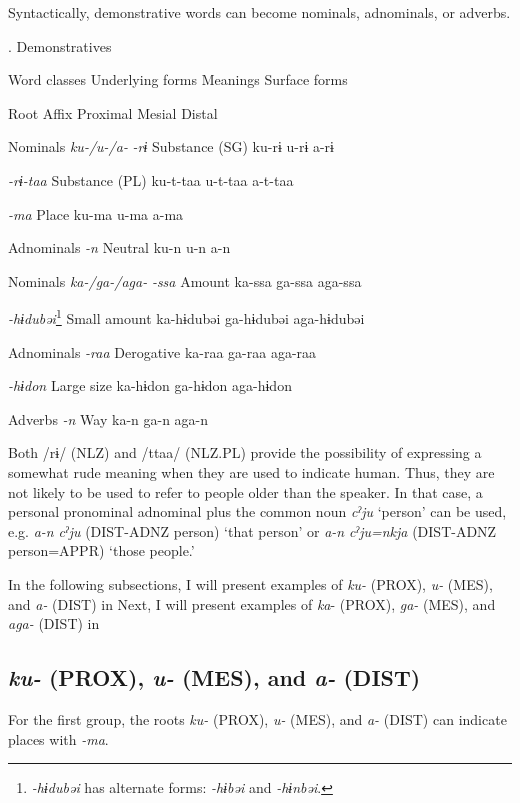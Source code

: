 Syntactically, demonstrative words can become nominals, adnominals, or adverbs.

\begin{styleBeschriftung}
\textmd{}\textmd{. Demonstratives}
\end{styleBeschriftung}

Word classes    Underlying forms  Meanings    Surface forms

    Root  Affix      Proximal  Mesial  Distal

Nominals    \textit{ku-/u-/a-}  \textit{{}-rɨ} Substance (SG)    ku-rɨ  u-rɨ  a-rɨ

      \textit{{}-rɨ-taa} Substance (PL)    ku-t-taa  u-t-taa  a-t-taa

      \textit{{}-ma} Place    ku-ma  u-ma  a-ma

Adnominals      \textit{{}-n} Neutral    ku-n  u-n  a-n

Nominals    \textit{ka-/ga-/aga-}  \textit{{}-ssa} Amount    ka-ssa  ga-ssa  aga-ssa

      \textit{{}-hɨdubəi}\footnote{\textit{{}-hɨdubəi} has alternate forms: \textit{{}-hɨbəi} and \textit{{}-hɨnbəi}.}  Small amount    ka-hɨdubəi  ga-hɨdubəi  aga-hɨdubəi

Adnominals      \textit{{}-raa} Derogative    ka-raa  ga-raa  aga-raa

      \textit{{}-hɨdon} Large size    ka-hɨdon  ga-hɨdon  aga-hɨdon

Adverbs      \textit{{}-n} Way    ka-n  ga-n  aga-n

Both /rɨ/ (NLZ) and /ttaa/ (NLZ.PL) provide the possibility of expressing a somewhat rude meaning when they are used to indicate human. Thus, they are not likely to be used to refer to people older than the speaker. In that case, a personal pronominal adnominal plus the common noun \textit{cˀju} ‘person’ can be used, e.g. \textit{a-n} \textit{cˀju} (DIST-ADNZ person) ‘that person’ or \textit{a-n} \textit{cˀju=nkja} (DIST-ADNZ person=APPR) ‘those people.’

In the following subsections, I will present examples of \textit{ku-} (PROX), \textit{u-} (MES), and \textit{a-} (DIST) in  Next, I will present examples of \textit{ka}{}- (PROX), \textit{ga-} (MES), and \textit{aga-} (DIST) in 

\subsection{\textit{ku-} (PROX), \textit{u-} (MES), and \textit{a-} (DIST)}
\label{sec:key:5.2.1}
For the first group, the roots \textit{ku-} (PROX), \textit{u-} (MES), and \textit{a-} (DIST) can indicate places with \textit{{}-ma}.

